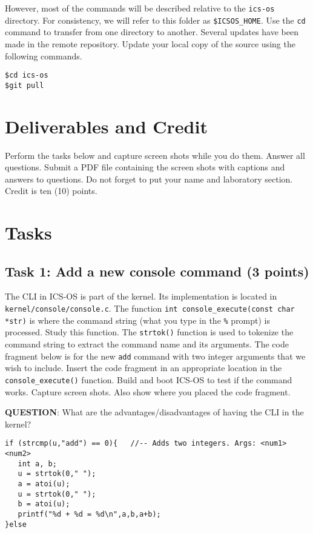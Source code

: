 \documentclass[a4paper, 11pt,oneside]{article}
\begin{document}
However, most of the commands will be described relative to the \texttt{ics-os} directory.
For consistency, we will refer to this folder as \texttt{\$ICSOS\_HOME}. Use the \texttt{cd} 
command to transfer from one directory to another.
 Several updates have been made in the remote repository. 
Update your local copy of the source using the following commands.

\begin{Verbatim}[frame=single] 
$cd ics-os
$git pull
\end{Verbatim}


\section{Deliverables and Credit}
Perform the tasks below and capture screen shots while you do them. Answer
all questions. Submit a PDF file containing the screen shots with captions
and answers to questions. Do not forget to put your name and laboratory
section.  Credit is ten (10) points.


\section{Tasks}

\subsection*{Task 1: Add a new console command (3 points)} 
The CLI in ICS-OS is part of the kernel. Its implementation is located in
\texttt{kernel/console/console.c}. The function \texttt{int
console\_execute(const char *str)} is where the command string (what you type
in the \texttt{\%} prompt) is processed. Study this function. The
\texttt{strtok()} function is used to tokenize the command string to extract
the command name and its arguments. The code fragment below is for the new
\texttt{add} command with two integer arguments that we wish to include.
Insert the code fragment in an appropriate location in the
\texttt{console\_execute()} function. Build and boot ICS-OS to test if the command works.
Capture screen shots. Also show where you placed the code
fragment. 

\textbf{QUESTION}: What are the advantages/disadvantages of having the CLI in
the kernel?

\begin{Verbatim}[frame=single] 
if (strcmp(u,"add") == 0){   //-- Adds two integers. Args: <num1> <num2> 
   int a, b; 
   u = strtok(0," "); 
   a = atoi(u);
   u = strtok(0," "); 
   b = atoi(u); 
   printf("%d + %d = %d\n",a,b,a+b); 
}else
\end{Verbatim}
\end{document}
